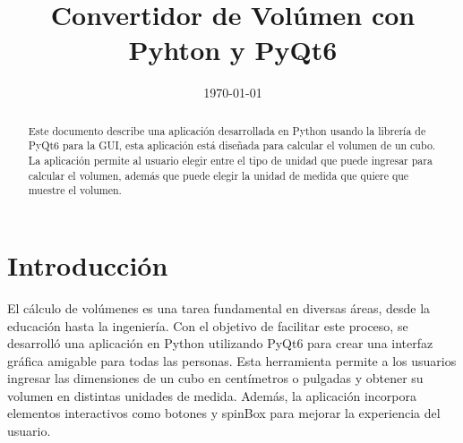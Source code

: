 \documentclass[conference]{IEEEtran}
\date{\specialdate\today}
\begin{document}
%
%
%

\newcommand{\breite}{0.9} %
\newcommand{\RelacionFiguradoscolumnas}{0.9}
\newcommand{\RelacionFiguradoscolumnasPuntoCinco}{0.45}




\title{Convertidor de Volúmen con Pyhton y PyQt6}

\author{
}



\maketitle

\begin{abstract} 
Este documento describe una aplicación desarrollada en Python usando la librería de PyQt6 para la GUI, esta aplicación está diseñada para calcular el volumen de un cubo. La aplicación permite al usuario elegir entre el tipo de unidad que puede ingresar para calcular el volumen, además que puede elegir la unidad de medida que quiere que muestre el volumen. 
\end{abstract}






\section{Introducción}

El cálculo de volúmenes es una tarea fundamental en diversas áreas, desde la educación hasta la ingeniería. Con el objetivo de facilitar este proceso, se desarrolló una aplicación en Python \cite{python} utilizando PyQt6 \cite{pyqt6} para crear una interfaz gráfica amigable para todas las personas. Esta herramienta permite a los usuarios ingresar las dimensiones de un cubo en centímetros o pulgadas y obtener su volumen en distintas unidades de medida. Además, la aplicación incorpora elementos interactivos como botones y spinBox para mejorar la experiencia del usuario.
 
\end{document}
